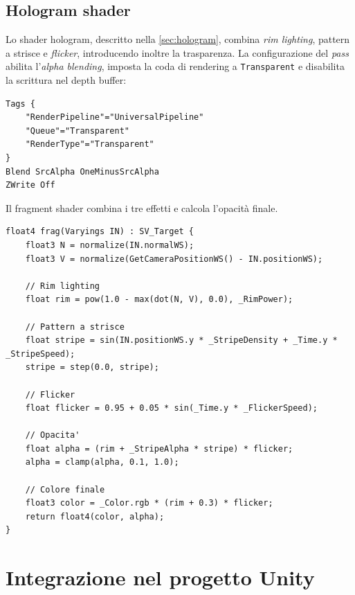 \documentclass[12pt,a4paper,twoside]{book}
\begin{document}
\begin{minipage}{\textwidth}

\subsection{Hologram shader}
\label{subsec:impl-hologram}

Lo shader hologram, descritto nella \cref{sec:hologram}, combina \textit{rim lighting}, pattern a strisce e \textit{flicker}, introducendo inoltre la trasparenza. La configurazione del \textit{pass} abilita l'\textit{alpha blending}, imposta la coda di rendering a \texttt{Transparent} e disabilita la scrittura nel depth buffer:

\begin{lstlisting}[style=hlsl,
    caption={Configurazione del pass per la trasparenza.},
    label={lst:holo-blend}]
Tags {
    "RenderPipeline"="UniversalPipeline"
    "Queue"="Transparent"
    "RenderType"="Transparent"
}
Blend SrcAlpha OneMinusSrcAlpha
ZWrite Off
\end{lstlisting}

Il fragment shader combina i tre effetti e calcola l'opacità finale.

\begin{lstlisting}[style=hlsl,
    caption={Fragment shader dell'hologram shader.},
    label={lst:holo-frag}]
float4 frag(Varyings IN) : SV_Target {
    float3 N = normalize(IN.normalWS);
    float3 V = normalize(GetCameraPositionWS() - IN.positionWS);
    
    // Rim lighting
    float rim = pow(1.0 - max(dot(N, V), 0.0), _RimPower);
    
    // Pattern a strisce
    float stripe = sin(IN.positionWS.y * _StripeDensity + _Time.y * _StripeSpeed);
    stripe = step(0.0, stripe);
    
    // Flicker
    float flicker = 0.95 + 0.05 * sin(_Time.y * _FlickerSpeed);
    
    // Opacita'
    float alpha = (rim + _StripeAlpha * stripe) * flicker;
    alpha = clamp(alpha, 0.1, 1.0);
    
    // Colore finale
    float3 color = _Color.rgb * (rim + 0.3) * flicker;
    return float4(color, alpha);
}
\end{lstlisting}
\end{minipage}

\newpage

\section{Integrazione nel progetto Unity}
\label{sec:progetto}
\end{document}
